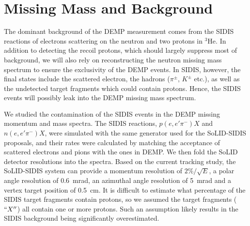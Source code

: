 \section{Missing Mass and Background}

The dominant background of the DEMP measurement comes from the SIDIS reactions
of electrons scattering on the neutron and two protons in $\mathrm{^{3}He}$. In
addition to detecting the recoil protons, which should largely suppress most of
background, we will also rely on reconstructing the neutron missing mass
spectrum to ensure the exclusivity of the DEMP events. In SIDIS, however, the
final states include the scattered electron, the hadrons ($\pi^{\pm}$,
$K^{\pm}$ etc.), as well as the undetected target fragments which could contain
protons. Hence, the SIDIS events will possibly leak into the DEMP missing mass
spectrum.

We studied the contamination of the SIDIS events in the DEMP missing momentum
and mass spectra. The SIDIS reactions, $p(e,e'\pi^{-})X$ and $n(e,e'\pi^{-})X$,
were simulated with the same generator used for the SoLID-SIDIS proposals, and
their rates were calculated by matching the acceptance of scattered electrons
and pions with the ones in DEMP. We then fold the SoLID detector resolutions
into the spectra. Based on the current tracking study, the SoLID-SIDIS system
can provide a momentum resolution of $2\%/\sqrt{E}$, a polar angle
resolution of 0.6~mrad, an azimuthal angle resolution of 5~mrad and a
vertex target position of 0.5~cm. It is difficult to estimate what
percentage of the SIDIS target fragments contain protons, so we assumed
the target fragments ($``X''$) all contain one or more protons. Such an
assumption likely results in the SIDIS background being significantly
overestimated.

